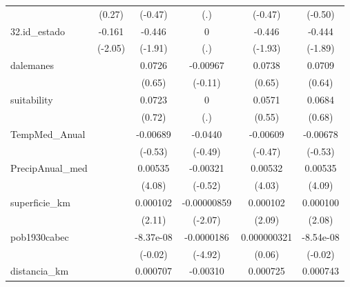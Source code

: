 {\begin{tabular}{l*{5}{c}}
            &      (0.27)         &     (-0.47)         &         (.)         &     (-0.47)         &     (-0.50)         \\
[1em]
32.id\_estado&      -0.161\sym{*}  &      -0.446         &           0         &      -0.446         &      -0.444         \\
            &     (-2.05)         &     (-1.91)         &         (.)         &     (-1.93)         &     (-1.89)         \\
[1em]
dalemanes   &                     &      0.0726         &    -0.00967         &      0.0738         &      0.0709         \\
            &                     &      (0.65)         &     (-0.11)         &      (0.65)         &      (0.64)         \\
[1em]
suitability &                     &      0.0723         &           0         &      0.0571         &      0.0684         \\
            &                     &      (0.72)         &         (.)         &      (0.55)         &      (0.68)         \\
[1em]
TempMed\_Anual&                     &    -0.00689         &     -0.0440         &    -0.00609         &    -0.00678         \\
            &                     &     (-0.53)         &     (-0.49)         &     (-0.47)         &     (-0.53)         \\
[1em]
PrecipAnual\_med&                     &     0.00535\sym{***}&    -0.00321         &     0.00532\sym{***}&     0.00535\sym{***}\\
            &                     &      (4.08)         &     (-0.52)         &      (4.03)         &      (4.09)         \\
[1em]
superficie\_km&                     &    0.000102\sym{*}  & -0.00000859\sym{*}  &    0.000102\sym{*}  &    0.000100\sym{*}  \\
            &                     &      (2.11)         &     (-2.07)         &      (2.09)         &      (2.08)         \\
[1em]
pob1930cabec&                     &   -8.37e-08         &  -0.0000186\sym{***}& 0.000000321         &   -8.54e-08         \\
            &                     &     (-0.02)         &     (-4.92)         &      (0.06)         &     (-0.02)         \\
[1em]
distancia\_km&                     &    0.000707         &    -0.00310\sym{***}&    0.000725         &    0.000743         \\

\end{tabular}}
